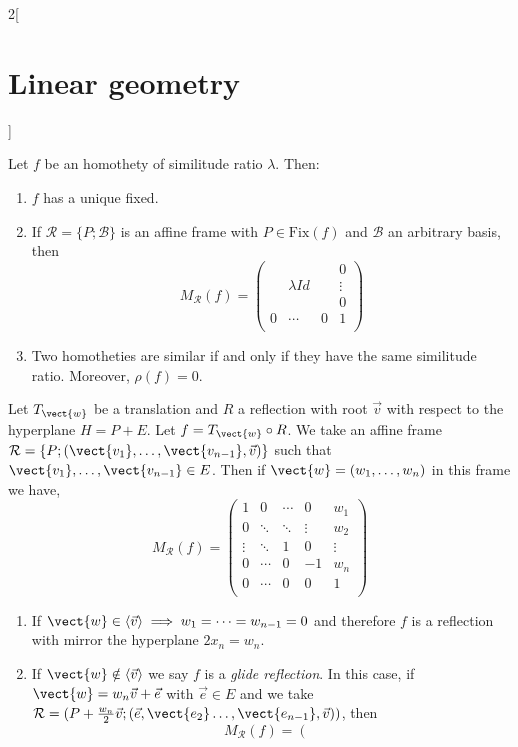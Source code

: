 \documentclass[../../../main.tex]{subfiles}
\begin{document}
\begin{multicols}{2}[\section{Linear geometry}]
\begin{definition}[Homotheties]
\end{definition}
\begin{prop}
Let $f$ be an homothety of similitude ratio $\lambda$. Then:
\begin{enumerate}
    \item $f$ has a unique fixed.
    \item If $\mathcal{R}=\{P;\mathcal{B}\}$ is an affine frame with $P\in\text{Fix}(f)$ and $\mathcal{B}$ an arbitrary basis, then $$M_\mathcal{R}(f)=\left(\begin{array}{ccc|c}
     & & & 0\\
    & \lambda Id & & \vdots\\
    & & & 0\\
    \hline
    0 & \cdots & 0 &  1\\
    \end{array}\right)$$
    \item Two homotheties are similar if and only if they have the same similitude ratio. Moreover, $\rho(f)=0$.
\end{enumerate}
\end{prop}
\begin{prop}
Let $T_{\vect{w}}$ be a translation and $R$ a reflection with root $\vec{v}$ with respect to the hyperplane $H=P+E$. Let $f=T_{\vect{w}}\circ R$. We take an affine frame $\mathcal{R}=\{P;(\vect{v_1},\ldots,\vect{v_{n-1}},\vec{v})\}$ such that $\vect{v_1},\ldots,\vect{v_{n-1}}\in E$. Then if $\vect{w}=(w_1,\ldots,w_n)$ in this frame we have,
    $$M_\mathcal{R}(f)=\left(\begin{array}{cccc|c}
    1 & 0 & \cdots & 0 & w_1\\
    0 & \ddots & \ddots & \vdots & w_2\\
    \vdots & \ddots & 1 & 0 & \vdots\\
    0 & \cdots & 0 & -1 & w_n\\
    \hline
    0 & \cdots & 0 & 0 &  1\\
    \end{array}\right)$$
    \begin{enumerate}
        \item If $\vect{w}\in\langle\vec{v}\rangle\implies w_1=\cdots =w_{n-1}=0$ and therefore $f$ is a reflection with mirror the hyperplane $2x_n=w_n$.
        \item If $\vect{w}\notin\langle\vec{v}\rangle$ we say $f$ is a \textit{glide reflection}. In this case, if $\vect{w}=w_n\vec{v}+\vec{e}$ with $\vec{e}\in E$ and we take $\mathcal{R}=(P+\frac{w_n}{2}\vec{v};(\vec{e},\vect{e_2}\ldots, \vect{e_{n-1}},\vec{v}))$, then $$M_\mathcal{R}(f)=\left(\begin{array}{cccc|c}

\end{array}$$
\end{enumerate}
\end{prop}
\end{multicols}
\end{document}
